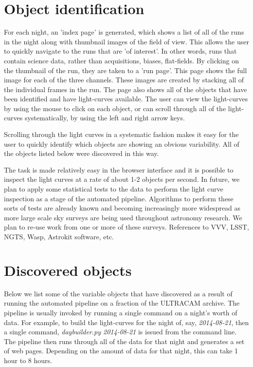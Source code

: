 
\section{Object identification}
For each night, an 'index page' is generated, which shows a list of all of the runs in the night along with thumbnail images of the field of view. This allows the user to quickly navigate to the runs that are 'of interest'. In other words, runs that contain science data, rather than acquisitions, biases, flat-fields. By clicking on the thumbnail of the run, they are taken to a 'run page'. This page shows the full image for each of the three channels. These images are created by stacking all of the individual frames in the run. The page also shows all of the objects that have been identified and have light-curves available. The user can view the light-curves by using the mouse to click on each object, or can scroll through all of the light-curves systematically, by using the left and right arrow keys. 

Scrolling through the light curves in a systematic fashion makes it easy for the user to quickly identify which objects are showing an obvious variability. All of the objects listed below were discovered in this way. 

The task is made relatively easy in the browser interface and it is possible to inspect the light curves at a rate of about 1-2 objects per second. In future, we plan to apply some statistical tests to the data to perform the light curve inspection as a stage of the automated pipeline. Algorithms to perform these sorts of tests are already known and becoming increasingly more widespread as more large scale sky surveys are being used throughout astronomy research. We plan to re-use work from one or more of these surveys. References to VVV, LSST, NGTS, Wasp, Astrokit software, etc.

\section{Discovered objects}

Below we list some of the variable objects that have discovered as a result of running the automated pipeline on a fraction of the ULTRACAM archive. The pipeline is usually invoked by running a single command on a night's worth of data. For example, to build the light-curves for the night of, say, \emph{2014-08-21}, then a single command, \emph{daybuilder.py 2014-08-21} is issued from the command line. The pipeline then runs through all of the data for that night and generates a set of web pages. Depending on the amount of data for that night, this can take 1 hour to 8 hours. 

